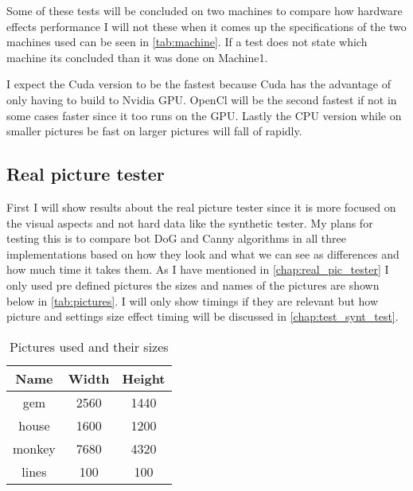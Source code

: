 Some of these tests will be concluded on two machines to compare how hardware effects performance I will not these when it comes up the specifications of the two machines used can be seen in \autoref{tab:machine}. If a test does not state which machine its concluded than it was done on Machine1.

I expect the Cuda version to be the fastest because Cuda has the advantage of only having to build to Nvidia \ac{GPU}. OpenCl will be the second fastest if not in some cases faster since it too runs on the \ac{GPU}. Lastly the \ac{CPU} version while on smaller pictures be fast on larger pictures will fall of rapidly.

\begin{table}[H]
\centering
{}
\caption{Specifications of the machines used in testing}
\label{tab:machine}
\end{table}

\subsection{Real picture tester}
\label{chap:reason}

First I will show results about the real picture tester since it is more focused on the visual aspects and not hard data like the synthetic tester. My plans for testing this is to compare bot \ac{DoG} and \ac{Canny} algorithms in all three implementations based on how they look and what we can see as differences and how much time it takes them. As I have mentioned in \autoref{chap:real_pic_tester} I only used pre defined pictures the sizes and names of the pictures are shown below in \autoref{tab:pictures}. I will only show timings if they are relevant but how picture and settings size effect timing will be discussed in \autoref{chap:test_synt_test}.

\begin{table}[H]
\centering
\begin{tabular}{| c | c | c |}
\hline
Name & Width & Height \\
\hline \hline	
gem & 2560 & 1440 \\
\hline
house & 1600 & 1200 \\
\hline
monkey & 7680 & 4320 \\
\hline
lines & 100 & 100 \\
\hline
\end{tabular}
\caption{Pictures used and their sizes}
\label{tab:pictures}
\end{table}

